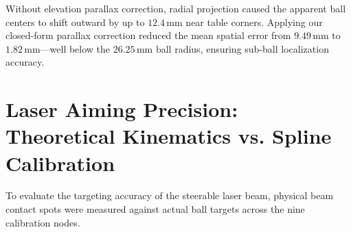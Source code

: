 \begin{table}[H]
\centering
\caption{Spatial Localization Accuracy Before and After Elevation Parallax Compensation}
\label{tab:homography_accuracy}
\end{table}

Without elevation parallax correction, radial projection caused the apparent ball centers to shift outward by up to $12.4\,\text{mm}$ near table corners. Applying our closed-form parallax correction reduced the mean spatial error from $9.49\,\text{mm}$ to $1.82\,\text{mm}$---well below the $26.25\,\text{mm}$ ball radius, ensuring sub-ball localization accuracy.

\section{Laser Aiming Precision: Theoretical Kinematics vs. Spline Calibration}
To evaluate the targeting accuracy of the steerable laser beam, physical beam contact spots were measured against actual ball targets across the nine calibration nodes.

